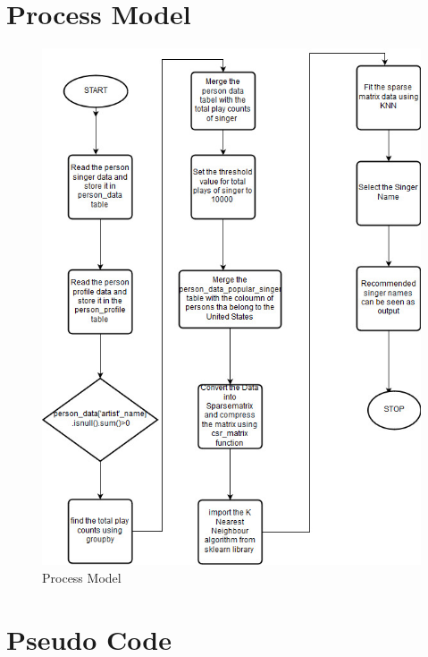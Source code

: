 \documentclass[paper=a4, fontsize=12pt]{scrartcl}
\numberwithin{equation}{section}		%
\numberwithin{figure}{section}			%
\numberwithin{table}{section}				%
\begin{document}
\section{Process Model}
\begin{figure}[H]

\begin{center}

\includegraphics[scale=.7]{process_model.jpg}

 \end{center}

  \caption{Process Model}

  \label{fig:}

\end{figure}

\pagebreak

\section{Pseudo Code}
\end{document}
